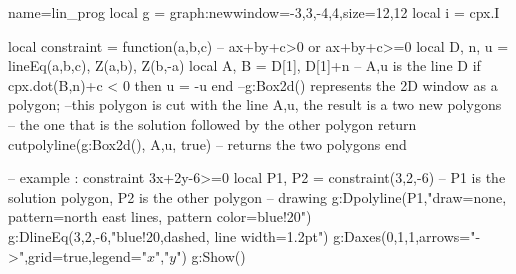 \documentclass{standalone}%
\begin{document}
\begin{luadraw}{name=lin_prog}
local g = graph:new{window={-3,3,-4,4},size={12,12}}
local i = cpx.I

local constraint = function(a,b,c) -- ax+by+c>0 or ax+by+c>=0
    local D, n, u = lineEq(a,b,c), Z(a,b), Z(b,-a)
    local A, B = D[1], D[1]+n -- {A,u} is the line D
    if cpx.dot(B,n)+c < 0 then u = -u end
    --g:Box2d() represents the 2D window as a polygon; 
    --this polygon is cut with the line {A,u}, the result is a two new polygons
    -- the one that is the solution followed by the other polygon
    return cutpolyline(g:Box2d(), {A,u}, true) -- returns the two polygons 
end

-- example : constraint 3x+2y-6>=0
local P1, P2 = constraint(3,2,-6) -- P1 is the solution polygon, P2 is the other polygon
-- drawing
g:Dpolyline(P1,"draw=none, pattern=north east lines, pattern color=blue!20")
g:DlineEq(3,2,-6,"blue!20,dashed, line width=1.2pt")
g:Daxes({0,1,1},{arrows="->",grid=true,legend={"$x$","$y$"}})
g:Show()
\end{luadraw}
\end{document}
